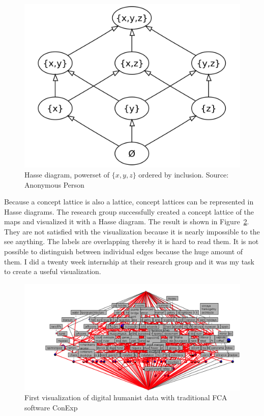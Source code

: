 \documentclass[11pt]{report}
\begin{document}
\begin{figure}[!ht]
	\centering
	\includegraphics[width=\linewidth]{./images/hasse}
\caption{Hasse diagram, powerset of $\{x,y,z\}$ ordered by inclusion. Source: Anonymous Person \cite{hassediagramfig}}
\label{figure:hasse}
\end{figure}

Because a concept lattice is also a lattice, concept lattices can be represented in Hasse diagrams. The research group successfully created a concept lattice of the maps and visualized it with a Hasse diagram. The result is shown in Figure~\ref{figure:firstVisualizaion}. They are not satisfied  with the visualization because it is nearly impossible to the see anything. The labels are overlapping thereby it is hard to read them. It is not possible to distinguish between individual edges because the huge amount of them. I did a twenty week internship at their research group and it was my task to create a useful visualization. \\

\begin{figure}[!ht]
	\centering
	\includegraphics[width=\linewidth]{./images/firstVisualization}
\caption{First visualization of digital humanist data with traditional FCA software ConExp}
\label{figure:firstVisualizaion}
\end{figure}
\end{document}
